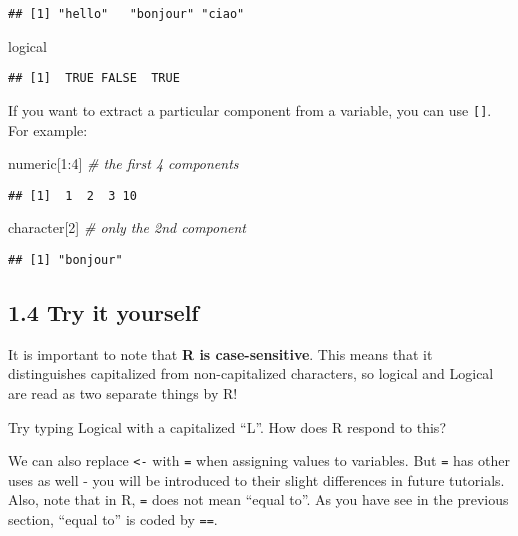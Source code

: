 \documentclass[
]{book}
\newenvironment{Shaded}{\begin{snugshade}}{\end{snugshade}}
\newcommand{\CommentTok}[1]{\textcolor[rgb]{0.56,0.35,0.01}{\textit{#1}}}
\newcommand{\DecValTok}[1]{\textcolor[rgb]{0.00,0.00,0.81}{#1}}
\newcommand{\NormalTok}[1]{#1}
\newcommand{\SpecialCharTok}[1]{\textcolor[rgb]{0.00,0.00,0.00}{#1}}
\begin{document}
\begin{verbatim}
## [1] "hello"   "bonjour" "ciao"
\end{verbatim}

\begin{Shaded}
\begin{Highlighting}[]
\NormalTok{logical}
\end{Highlighting}
\end{Shaded}

\begin{verbatim}
## [1]  TRUE FALSE  TRUE
\end{verbatim}

If you want to extract a particular component from a variable, you can use \texttt{{[}{]}}. For example:

\begin{Shaded}
\begin{Highlighting}[]
\NormalTok{numeric[}\DecValTok{1}\SpecialCharTok{:}\DecValTok{4}\NormalTok{] }\CommentTok{\# the first 4 components}
\end{Highlighting}
\end{Shaded}

\begin{verbatim}
## [1]  1  2  3 10
\end{verbatim}

\begin{Shaded}
\begin{Highlighting}[]
\NormalTok{character[}\DecValTok{2}\NormalTok{] }\CommentTok{\# only the 2nd component}
\end{Highlighting}
\end{Shaded}

\begin{verbatim}
## [1] "bonjour"
\end{verbatim}

\hypertarget{try-it-yourself-3}{%
\subsection{1.4 Try it yourself}\label{try-it-yourself-3}}

It is important to note that \textbf{R is case-sensitive}. This means that it distinguishes capitalized from non-capitalized characters, so logical and Logical are read as two separate things by R!

Try typing Logical with a capitalized ``L''. How does R respond to this?

We can also replace \texttt{\textless{}-} with \texttt{=} when assigning values to variables. But \texttt{=} has other uses as well - you will be introduced to their slight differences in future tutorials. Also, note that in R, \texttt{=} does not mean ``equal to''. As you have see in the previous section, ``equal to'' is coded by \texttt{==}.
\end{document}
